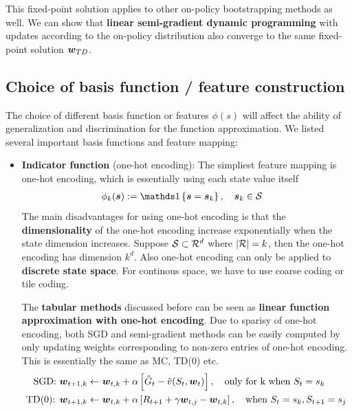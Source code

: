 \documentclass[11pt]{article}
\begin{document}
This fixed-point solution applies to other on-policy bootstrapping methods as well. We can show that \textbf{linear semi-gradient dynamic programming} with updates according to the on-policy distribution also converge to the same fixed-point solution $\boldsymbol{w}_{TD}$.

\subsection{Choice of basis function / feature construction }
The choice of different basis function or features $\phi(s)$ will affect the ability of generalization and discrimination for the function approximation. We listed several important basis functions and feature mapping: 
\begin{itemize}
\item \textbf{Indicator function} (one-hot encoding): The simpliest feature mapping is one-hot encoding, which is essentially using each state value itself
\begin{align*}
\phi_{k}(\mb{s}) &:= \ind{\mb{s} = \mb{s}_{k}}, \quad \mb{s}_{k} \in \cS 
\end{align*} The main disadvantages for using one-hot encoding is that the \textbf{dimensionality} of the one-hot encoding increase exponentially when the state dimension increases. Suppose ${\mathcal S} \subset {\mathcal R}^{d}$ where $|{\mathcal R}| = k$, then the one-hot encoding has dimension $k^d$. Also one-hot encoding can only be applied to \textbf{discrete state space}. For continous space, we have to use coarse coding or tile coding. 

The\textbf{ tabular methods} discussed before can be seen as \textbf{linear function approximation with one-hot encoding}. Due to sparisy of one-hot encoding, both SGD and semi-gradient methods can be easily computed by only updating weights corresponding to non-zero entries of one-hot encoding. This is essentially the same as MC, TD(0) etc. 
\begin{align*}
\text{SGD: }\boldsymbol{w}_{t+1,k} &\leftarrow  \boldsymbol{w}_{t, k} + \alpha \left[\hat{G}_{t} - \hat{v}(S_{t}, \boldsymbol{w}_{t})\right], \quad \text{only for k when }S_{t}=s_{k}\\
\text{TD(0): }\boldsymbol{w}_{t+1,k} &\leftarrow  \boldsymbol{w}_{t,k} + \alpha \left[R_{t+1} + \gamma \boldsymbol{w}_{t,j} -  \boldsymbol{w}_{t,k}\right], \quad \text{when }S_{t}=s_{k}, S_{t+1}=s_{j}
\end{align*}



\end{itemize}
\end{document}
